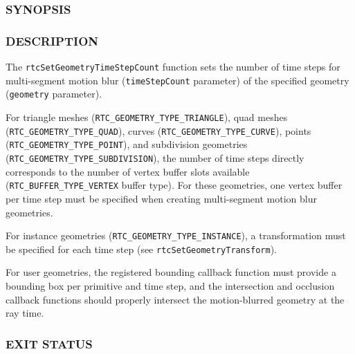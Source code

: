 \subsubsection{SYNOPSIS}\label{synopsis}

\begin{Shaded}
\begin{Highlighting}[]

\OperatorTok{(}
\OperatorTok{,}
   
\OperatorTok{);}
\end{Highlighting}
\end{Shaded}

\subsubsection{DESCRIPTION}\label{description}

The \texttt{rtcSetGeometryTimeStepCount} function sets the number of
time steps for multi-segment motion blur (\texttt{timeStepCount}
parameter) of the specified geometry (\texttt{geometry} parameter).

For triangle meshes (\texttt{RTC\_GEOMETRY\_TYPE\_TRIANGLE}), quad
meshes (\texttt{RTC\_GEOMETRY\_TYPE\_QUAD}), curves
(\texttt{RTC\_GEOMETRY\_TYPE\_CURVE}), points
(\texttt{RTC\_GEOMETRY\_TYPE\_POINT}), and subdivision geometries
(\texttt{RTC\_GEOMETRY\_TYPE\_SUBDIVISION}), the number of time steps
directly corresponds to the number of vertex buffer slots available
(\texttt{RTC\_BUFFER\_TYPE\_VERTEX} buffer type). For these geometries,
one vertex buffer per time step must be specified when creating
multi-segment motion blur geometries.

For instance geometries (\texttt{RTC\_GEOMETRY\_TYPE\_INSTANCE}), a
transformation must be specified for each time step (see
\texttt{rtcSetGeometryTransform}).

For user geometries, the registered bounding callback function must
provide a bounding box per primitive and time step, and the intersection
and occlusion callback functions should properly intersect the
motion-blurred geometry at the ray time.

\subsubsection{EXIT STATUS}\label{exit-status}

